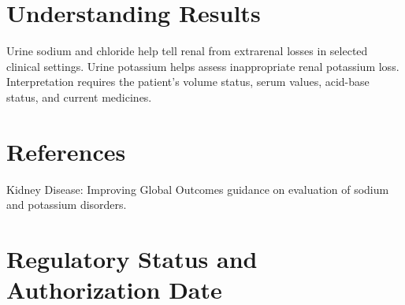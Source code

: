 \section*{Understanding Results}
Urine sodium and chloride help tell renal from extrarenal losses in selected clinical settings. Urine potassium helps assess inappropriate renal potassium loss. Interpretation requires the patient's volume status, serum values, acid-base status, and current medicines.

\section*{References}
Kidney Disease: Improving Global Outcomes guidance on evaluation of sodium and potassium disorders.

\clearpage


\section*{Regulatory Status and Authorization Date}

\clearpage
